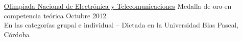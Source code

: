 \documentclass[10pt,a4paper]{article}
\begin{document}
\vspace{0.2em}
\headedsection
    {\href{}{Olimpiada Nacional de Electrónica y Telecomunicaciones}}
    {\textsc{}}{
    \headedsubsection
        {Medalla de oro en competencia teórica}
        {Octubre 2012}
        {\\En las categorías grupal e individual -- Dictada en la Universidad Blas Pascal, Córdoba}
}

%
%
%
%
%
\end{document}
